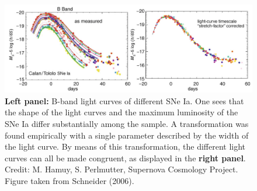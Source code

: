 \documentclass[a4paper,10pt]{article}
\begin{document}
\begin{figure}[t!]
    \centering
    \includegraphics[width=16cm]{figures/SNeIa_corrected.png}
    \caption{\footnotesize{\textbf{Left panel:} B-band light curves of different SNe Ia. One sees that the shape of the light curves and the maximum luminosity of the SNe Ia differ substantially among the sample. A transformation was found empirically with a single parameter described by the width of the light curve. By means of this transformation, the different light curves can all be made congruent, as displayed in the \textbf{right panel}. Credit: M. Hamuy, S. Perlmutter, Supernova Cosmology Project. Figure taken from Schneider (2006).}}
    \label{fig:sneia_corrected}
\end{figure}
\end{document}
